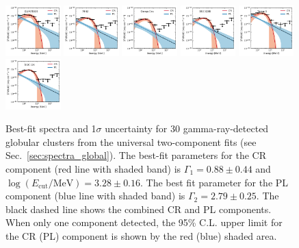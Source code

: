 \documentclass[doublespace,nopageskip]{VTthesis}
\begin{document}
\begin{appendices}
\begin{figure}
\includegraphics[width=0.19\textwidth]{Figures/Globular/spectra/2comp_1.pdf}
\includegraphics[width=0.19\textwidth]{Figures/Globular/spectra/2comp_11.pdf}
\includegraphics[width=0.19\textwidth]{Figures/Globular/spectra/2comp_6.pdf}
\includegraphics[width=0.19\textwidth]{Figures/Globular/spectra/2comp_15.pdf}
\includegraphics[width=0.19\textwidth]{Figures/Globular/spectra/2comp_29.pdf}
\includegraphics[width=0.19\textwidth]{Figures/Globular/spectra/2comp_3.pdf}
\caption{Best-fit spectra and 1$\sigma$ uncertainty for 30 gamma-ray-detected globular clusters from the universal two-component fits (see Sec.~\ref{sec:spectra_global}). The best-fit parameters for the CR component (red line with shaded band) is $\Gamma_1 = 0.88 \pm 0.44$ and $\log(E_\mathrm{cut}/\mathrm{MeV})=3.28 \pm 0.16$. The best fit parameter for the {PL} component (blue line with shaded band) is $\Gamma_2 = 2.79 \pm 0.25$. 
The black dashed line shows the combined CR and {PL} components. When only one component detected, the 95\% C.L. upper limit for the CR ({PL}) component is shown by the red (blue) shaded area.}
\label{fig:2comp}
\end{figure}


\end{appendices}
\end{document}
